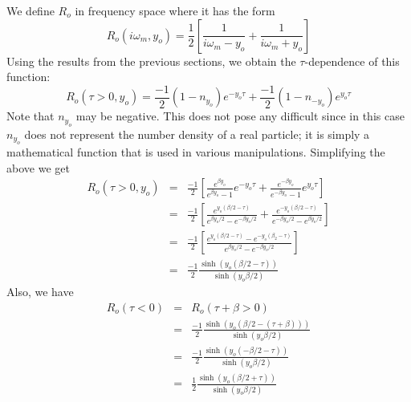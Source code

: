 We define $R_o$ in frequency space where it has the form
\begin{equation}
R_o(i \omega_m, y_o) = \frac{1}{2} \left[ \frac{1}{i \omega_m - y_o}
             + \frac{1}{i \omega_m + y_o} \right] 
\end{equation}
Using the results from the previous sections, we obtain
the $\tau$-dependence of this function:
\begin{equation}
R_o(\tau > 0, y_o)  =  \frac{-1}{2}( 1 - n_{y_o})e^{-y_o \tau} +
 \frac{-1}{2}( 1 - n_{-y_o})e^{y_o \tau}
\end{equation}	
Note that $n_{y_o}$ may be negative.  This  does not pose any
difficult since in this case  $n_{y_o}$ does not represent
the number density of a real particle; it is simply a mathematical
function that is used in various manipulations.
Simplifying the above we get
\begin{eqnarray}
R_o(\tau > 0, y_o) & = & \frac{-1}{2} \left[
  \frac{e^{\beta y_o}}{e^{\beta y_o} - 1} e^{-y_o \tau}
+ \frac{e^{-\beta y_o}}{e^{-\beta y_o} -1} e^{y_o \tau} \right] \\
& = & \frac{-1}{2}\left[ \frac{e^{y_o(\beta/2 - \tau)}}
{e^{\beta y_o / 2} - e^{-\beta y_o / 2}} +
\frac{e^{-y_o(\beta /2 - \tau)}}
{e^{-\beta y_o /2} - e^{\beta y_o / 2}} \right] \\
& = & \frac{-1}{2}\left[ \frac{ e^{y_o(\beta/2 - \tau)} -
e^{-y_o(\beta_2 - \tau)}}{e^{\beta y_o /2} - e^{-\beta y_o / 2}} \right] \\
& = & \frac{-1}{2} \frac{\sinh(y_o (\beta/2 - \tau))}
{\sinh(y_o \beta / 2)}
\end{eqnarray}
Also, we have
\begin{eqnarray}
R_o(\tau < 0) & = & R_o(\tau + \beta > 0) \\
& = & \frac{-1}{2} \frac{\sinh(y_o (\beta / 2 - (\tau + \beta)))}
{\sinh(y_o \beta / 2)} \\
& = & \frac{-1}{2} \frac{\sinh(y_o(-\beta/2 - \tau))}
{\sinh(y_o \beta / 2)} \\
& = & \frac{1}{2} \frac{\sinh(y_o(\beta /2 + \tau))}
{\sinh(y_o \beta / 2)}
\end{eqnarray}

